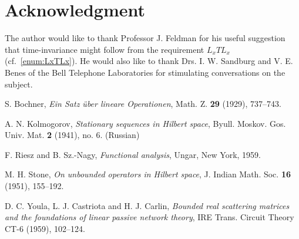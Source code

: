\documentclass[12pt]{article}
\theoremstyle{definition}
\begin{document}
\section*{Acknowledgment}
The author would like to thank Professor J. Feldman for his useful suggestion that time-invariance might follow from the requirement $L_x T L_x$ (cf.~\ref{enum:LxTLx}). He would also like to thank Drs. I. W. Sandburg and V. E. Benes of the Bell Telephone Laboratories for stimulating conversations on the subject.

\begin{thebibliography}{9}

S. Bochner, \emph{Ein Satz über lineare Operationen}, Math. Z. \textbf{29} (1929), 737--743.

A. N. Kolmogorov, \emph{Stationary sequences in Hilbert space}, Byull. Moskov. Gos. Univ. Mat. \textbf{2} (1941), no. 6. (Russian)

F. Riesz and B. Sz.-Nagy, \emph{Functional analysis}, Ungar, New York, 1959.

M. H. Stone, \emph{On unbounded operators in Hilbert space}, J. Indian Math. Soc. \textbf{16} (1951), 155--192.

D. C. Youla, L. J. Castriota and H. J. Carlin, \emph{Bounded real scattering matrices and the foundations of linear passive network theory}, IRE Trans. Circuit Theory CT-6 (1959), 102--124.

\end{thebibliography}
\end{document}
